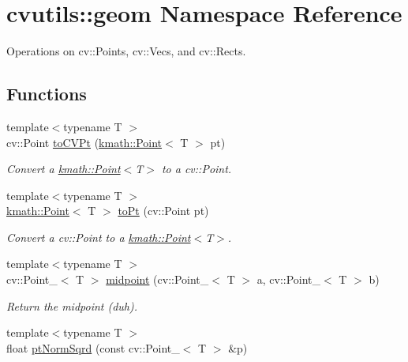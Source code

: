 \hypertarget{namespacecvutils_1_1geom}{\section{cvutils\-:\-:geom Namespace Reference}
\label{namespacecvutils_1_1geom}
}


Operations on {\ttfamily cv\-::\-Point}s, {\ttfamily cv\-::\-Vec}s, and {\ttfamily cv\-::\-Rect}s.  


\subsection*{Functions}
\begin{DoxyCompactItemize}
\item 
{\footnotesize template$<$typename T $>$ }\\cv\-::\-Point \hyperlink{namespacecvutils_1_1geom_a6b778c479475cf621f6adbe05de4bbb1}{to\-C\-V\-Pt} (\hyperlink{structkmath_1_1_point}{kmath\-::\-Point}$<$ T $>$ pt)
\begin{DoxyCompactList}\small\item\em Convert a {\ttfamily \hyperlink{structkmath_1_1_point}{kmath\-::\-Point}$<$T$>$} to a {\ttfamily cv\-::\-Point}. \end{DoxyCompactList}\item 
{\footnotesize template$<$typename T $>$ }\\\hyperlink{structkmath_1_1_point}{kmath\-::\-Point}$<$ T $>$ \hyperlink{namespacecvutils_1_1geom_af5531da4d19355a400306b5a55bb71c2}{to\-Pt} (cv\-::\-Point pt)
\begin{DoxyCompactList}\small\item\em Convert a {\ttfamily cv\-::\-Point} to a {\ttfamily \hyperlink{structkmath_1_1_point}{kmath\-::\-Point}$<$T$>$}. \end{DoxyCompactList}\item 
{\footnotesize template$<$typename T $>$ }\\cv\-::\-Point\-\_\-$<$ T $>$ \hyperlink{namespacecvutils_1_1geom_a6a1ce8e52ffaec2a0b1f4a05a2e9a52a}{midpoint} (cv\-::\-Point\-\_\-$<$ T $>$ a, cv\-::\-Point\-\_\-$<$ T $>$ b)
\begin{DoxyCompactList}\small\item\em Return the midpoint (duh). \end{DoxyCompactList}\item 
{\footnotesize template$<$typename T $>$ }\\float \hyperlink{namespacecvutils_1_1geom_a8d1d619355d2606b616341a63c0fee97}{pt\-Norm\-Sqrd} (const cv\-::\-Point\-\_\-$<$ T $>$ \&p)

\end{DoxyCompactItemize}
